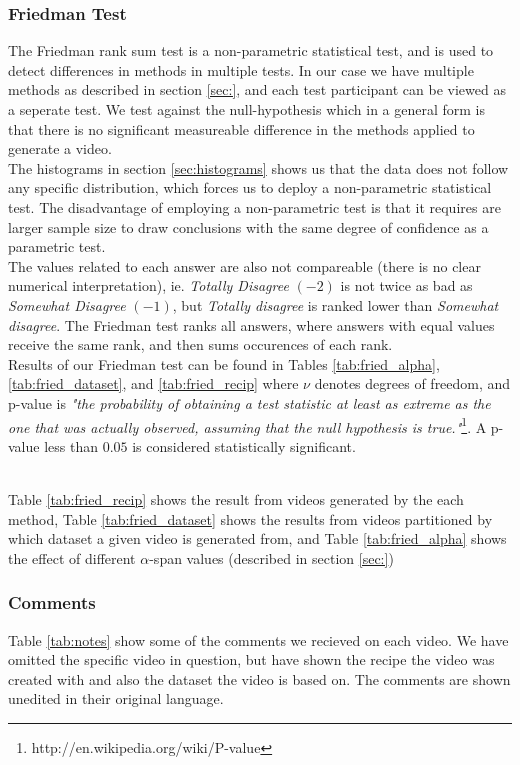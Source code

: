 \subsubsection{Friedman Test}
%
The Friedman rank sum test is a non-parametric statistical test, and is used to detect differences in methods in multiple tests. In our case we have multiple methods as described in section \ref{sec:}, and each test participant can be viewed as a seperate test. We test against the null-hypothesis which in a general form is that there is no significant measureable difference in the methods applied to generate a video.\\
%
The histograms in section \ref{sec:histograms} shows us that the data does not follow any specific distribution, which forces us to deploy a non-parametric statistical test. The disadvantage of employing a non-parametric test is that it requires are larger sample size to draw conclusions with the same degree of confidence as a parametric test.\\
%
The values related to each answer are also not compareable (there is no clear numerical interpretation), ie. \textit{Totally Disagree} $(-2)$ is not twice as bad as \textit{Somewhat Disagree} $(-1)$, but \textit{Totally disagree} is ranked lower than \textit{Somewhat disagree}. The Friedman test ranks all answers, where answers with equal values receive the same rank, and then sums occurences of each rank.\\
%
Results of our Friedman test can be found in Tables \ref{tab:fried_alpha}, \ref{tab:fried_dataset}, and \ref{tab:fried_recip} where $\nu$ denotes degrees of freedom, and p-value is \textit{"the probability of obtaining a test statistic at least as extreme as the one that was actually observed, assuming that the null hypothesis is true."}\footnote{http://en.wikipedia.org/wiki/P-value}. A p-value less than $0.05$ is considered statistically significant.



%
\\ %
Table \ref{tab:fried_recip} shows the result from videos generated by the each method, Table \ref{tab:fried_dataset} shows the results from videos partitioned by which dataset a given video is generated from, and Table \ref{tab:fried_alpha} shows the effect of different $\alpha$-span values (described in section \ref{sec:})
%
\subsubsection{Comments}\label{sec:comments}
%
Table \ref{tab:notes} show some of the comments we recieved on each video. We have omitted the specific video in question, but have shown the recipe the video was created with and also the dataset the video is based on. The comments are shown unedited in their original language.
%

%
